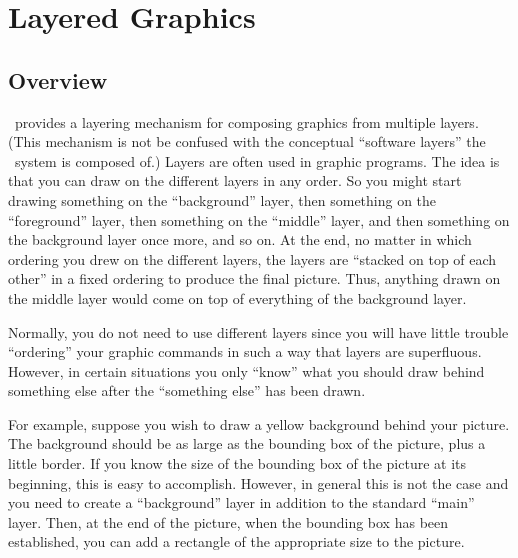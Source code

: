 %
%
%


\section{Layered Graphics}

\label{section-layers}

\subsection{Overview}

\pgfname\ provides a layering mechanism for composing graphics from
multiple layers. (This mechanism is not be confused with the
conceptual ``software layers'' the \pgfname\ system is composed of.)
Layers are often used in graphic programs. The idea is that you can
draw on the different layers in any order. So you might start drawing
something on the ``background'' layer, then something on the
``foreground'' layer, then something on the ``middle'' layer, and then
something on the background layer once more, and so on. At the end, no
matter in which ordering you drew on the different layers, the layers
are ``stacked on top of each other'' in a fixed ordering to produce
the final picture. Thus, anything drawn on the middle layer would come
on top of everything of the background layer.

Normally, you do not need to use different layers since you will have
little trouble ``ordering'' your graphic commands in such a way that
layers are superfluous. However, in certain situations you only
``know'' what you should draw behind something else after the
``something else'' has been drawn.

For example, suppose you wish to draw a yellow background behind your
picture. The background should be as large as the bounding box of the
picture, plus a little border. If you know the size of the bounding box
of the picture at its beginning, this is easy to accomplish. However,
in general this is not the case and you need to create a
``background'' layer in addition to the standard ``main'' layer. Then,
at the end of the picture, when the bounding box has been established,
you can add a rectangle of the appropriate size to the picture.



